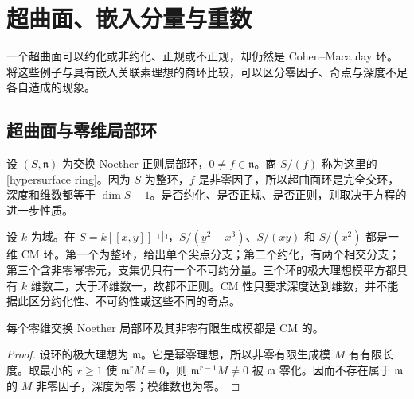 
\section{超曲面、嵌入分量与重数}
\label{b3:sec:1904}

一个超曲面可以约化或非约化、正规或不正规，却仍然是 Cohen–Macaulay 环。将这些例子与具有嵌入关联素理想的商环比较，可以区分零因子、奇点与深度不足各自造成的现象。


%
%
%

\subsection{超曲面与零维局部环}
\label{b3:subsec:1904:01}

设 \((S,\mathfrak n)\) 为交换 Noether 正则局部环，\(0\ne f\in\mathfrak n\)。商 \(S/(f)\) 称为这里的[hypersurface ring]。因为 \(S\) 为整环，\(f\) 是非零因子，所以超曲面环是完全交环，深度和维数都等于 \(\dim S-1\)。是否约化、是否正规、是否正则，则取决于方程的进一步性质。

\ProseParagraphBreak
设 \(k\) 为域。在 \(S=k[\![x,y]\!]\) 中，\(S/(y^2-x^3)\)、\(S/(xy)\) 和 \(S/(x^2)\) 都是一维 CM 环。第一个为整环，给出单个尖点分支；第二个约化，有两个相交分支；第三个含非零幂零元，支集仍只有一个不可约分量。三个环的极大理想模平方都具有 \(k\) 维数二，大于环维数一，故都不正则。CM 性只要求深度达到维数，并不能据此区分约化性、不可约性或这些不同的奇点。

\begin{proposition}\label{b3:prop:zero-dimensional-cm}
	每个零维交换 Noether 局部环及其非零有限生成模都是 CM 的。
\end{proposition}
\begin{proof}
	设环的极大理想为 \(\mathfrak m\)。它是幂零理想，所以非零有限生成模 \(M\) 有有限长度。取最小的 \(r\ge1\) 使 \(\mathfrak m^rM=0\)，则 \(\mathfrak m^{r-1}M\ne0\) 被 \(\mathfrak m\) 零化。因而不存在属于 \(\mathfrak m\) 的 \(M\) 非零因子，深度为零；模维数也为零。
\end{proof}

